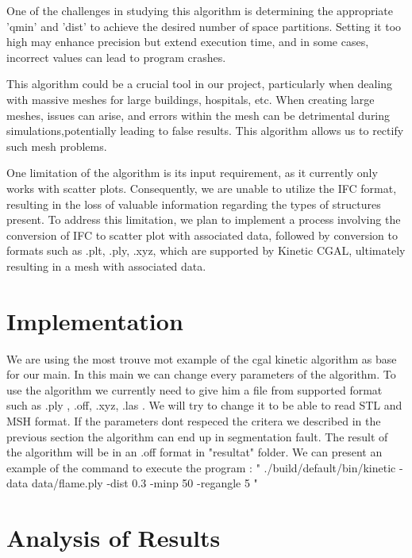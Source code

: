 \documentclass{article}
\begin{document}
\begin{itemize}
  One of the challenges in studying this algorithm is determining the appropriate 'qmin' and 'dist' to achieve the desired number of space partitions.
  Setting it too high may enhance precision but extend execution time, and in some cases, incorrect values can lead to program crashes.

This algorithm could be a crucial tool in our project, particularly when dealing with massive meshes for large buildings,
hospitals, etc. When creating large meshes, issues can arise, and errors within the mesh can be detrimental during simulations,potentially leading to false results. 
This algorithm allows us to rectify such mesh problems.

One limitation of the algorithm is its input requirement, as it currently only works with scatter plots. Consequently, we are unable to utilize the IFC format, 
resulting in the loss of valuable information regarding the types of structures present. To address this limitation, 
we plan to implement a process involving the conversion of IFC to scatter plot with associated data, followed by conversion to formats such as .plt, .ply, .xyz,
which are supported by Kinetic CGAL, ultimately resulting in a mesh with associated data.


\section{Implementation}

We are using the most trouve mot example of the cgal kinetic algorithm as base for our main. In this main we can change every parameters of the algorithm.
\newline
To use the algorithm we currently need to give him a file from supported format such as .ply , .off, .xyz, .las .
We will try to change it to be able to read STL and MSH format.
If the parameters dont respeced the critera we described in the previous section the algorithm can end up in segmentation fault.
The result of the algorithm will be in an .off format in "resultat" folder.
\newline
We can present an example of the command to execute the program :
\newline
" ./build/default/bin/kinetic -data data/flame.ply -dist 0.3 -minp 50 -regangle 5  "
\newline
\section{Analysis of Results}


\end{itemize}
\end{document}
